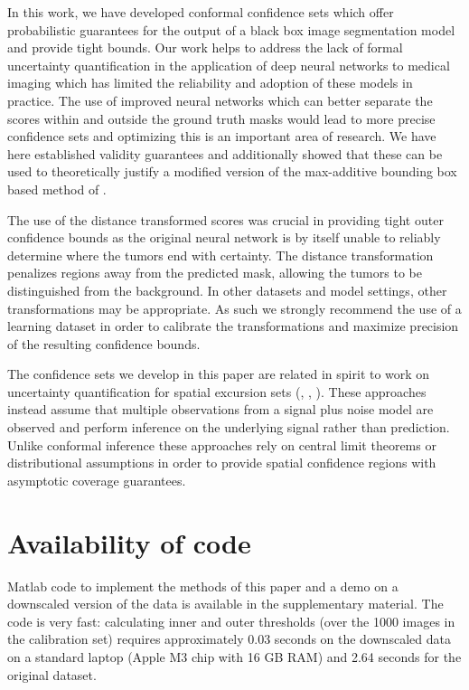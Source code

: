 In this work, we have developed conformal confidence sets which offer probabilistic guarantees for the output of a black box image segmentation model and provide tight bounds. Our work helps to address the lack of formal uncertainty quantification in the application of deep neural networks to medical imaging which has limited the reliability and adoption of these models in practice. The use of improved neural networks which can better separate the scores within and outside the ground truth masks would lead to more precise confidence sets and optimizing this is an important area of research. We have here established validity guarantees and additionally showed that these can be used to theoretically justify a modified version of the max-additive bounding box based method of \cite{Andeol2023}. 

The use of the distance transformed scores was crucial in providing tight outer confidence bounds as the original neural network is by itself unable to reliably determine where the tumors end with certainty.  The distance transformation penalizes regions away from the predicted mask, allowing the tumors to be distinguished from the background. In other datasets and model settings, other transformations may be appropriate. As such we strongly recommend the use of a learning dataset in order to calibrate the transformations and maximize precision of the resulting confidence bounds.

The confidence sets we develop in this paper are related in spirit to work on uncertainty quantification for spatial excursion sets (\cite{chen2017density}, \cite{Bowring2019}, \cite{Mejia2020}). These approaches instead assume that multiple observations from a signal plus noise model are observed and perform inference on the underlying signal rather than prediction. Unlike conformal inference these approaches rely on central limit theorems or distributional assumptions in order to provide spatial confidence regions with asymptotic coverage guarantees. 

\section*{Availability of code}
\vspace{-0.1cm}
Matlab code to implement the methods of this paper and a demo on a downscaled version of the data is available in the supplementary material. The code is very fast: calculating inner and outer thresholds (over the 1000 images in the calibration set) requires approximately 0.03 seconds on the downscaled data on a standard laptop (Apple M3 chip with 16 GB RAM) and 2.64 seconds for the original dataset.